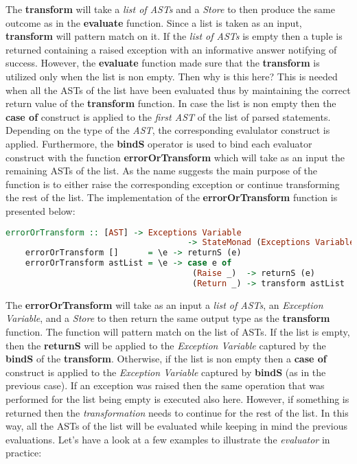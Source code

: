 \documentclass[a4paper, onecolumn]{article}
\begin{document}
    \noindent The \textbf{transform} will take a \textit{list of ASTs} and a \textit{Store} to then produce the same outcome as in the \textbf{evaluate} function. Since a list is taken as an input, \textbf{transform} will pattern match on it. If the \textit{list of ASTs} is empty then a tuple is returned containing a raised exception with an informative answer notifying of success. However, the \textbf{evaluate} function made sure that the \textbf{transform} is utilized only when the list is non empty. Then why is this here? This is needed when all the ASTs of the list have been evaluated thus by maintaining the correct return value of the \textbf{transform} function. In case the list is non empty then the \textbf{case of} construct is applied to the \textit{first AST} of the list of parsed statements. Depending on the type of the \textit{AST}, the corresponding evalulator construct is applied. Furthermore, the \textbf{bindS} operator is used to bind each evaluator construct with the function \textbf{errorOrTransform} which will take as an input the remaining ASTs of the list. As the name suggests the main purpose of the function is to either raise the corresponding exception or continue transforming the rest of the list. The implementation of the \textbf{errorOrTransform} function is presented below: 
    
    \begin{tcolorbox}
    \begin{lstlisting}[language=Haskell] 
    errorOrTransform :: [AST] -> Exceptions Variable 
                                     -> StateMonad (Exceptions Variable)
    errorOrTransform []      = \e -> returnS (e)
    errorOrTransform astList = \e -> case e of 
                                      (Raise _)  -> returnS (e) 
                                      (Return _) -> transform astList 
    \end{lstlisting}
    \end{tcolorbox}
    
    \noindent The \textbf{errorOrTransform} will take as an input a \textit{list of ASTs}, an \textit{Exception Variable}, and a \textit{Store} to then return the same output type as the \textbf{transform} function. The function will pattern match on the list of ASTs. If the list is empty, then the \textbf{returnS} will be applied to the \textit{Exception Variable} captured by the \textbf{bindS} of the \textbf{transform}. Otherwise, if the list is non empty then a \textbf{case of} construct is applied to the \textit{Exception Variable} captured by \textbf{bindS} (as in the previous case). If an exception was raised then the same operation that was performed for the list being empty is executed also here. However, if something is returned then the \textit{transformation} needs to continue for the rest of the list. In this way, all the ASTs of the list will be evaluated while keeping in mind the previous evaluations. Let's have a look at a few examples to illustrate the \textit{evaluator} in practice:
    
\end{document}
